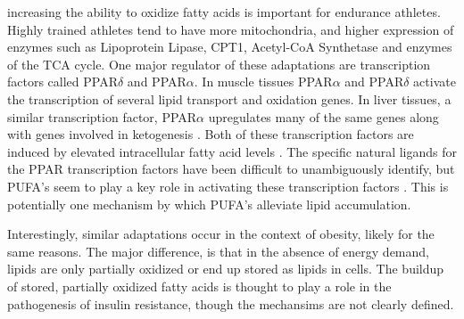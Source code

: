 \documentclass{tufte-handout}
\begin{document}
 increasing the ability to oxidize fatty acids is important for endurance athletes.  Highly trained athletes tend to have more mitochondria, and higher expression of enzymes such as Lipoprotein Lipase, CPT1, Acetyl-CoA Synthetase and enzymes of the TCA cycle.  One major regulator of these adaptations are transcription factors called PPAR$\delta$ and PPAR$\alpha$.  In muscle tissues PPAR$\alpha$ and PPAR$\delta$  activate the transcription of several lipid transport and oxidation genes.  In liver tissues, a similar transcription factor, PPAR$\alpha$ upregulates many of the same genes along with genes involved in ketogenesis \citep{Kersten2000,Badman2007}.  Both of these transcription factors are induced by elevated intracellular fatty acid levels \citep{Keller1993}.  The specific natural ligands for the PPAR transcription factors have been difficult to unambiguously identify, but PUFA's seem to play a key role in activating these transcription factors \citep{Forman1997}.  This is potentially one mechanism by which PUFA's alleviate lipid accumulation.

Interestingly, similar adaptations occur in the context of obesity, likely for the same reasons.  The major difference, is that in the absence of energy demand, lipids are only partially oxidized or end up stored as lipids in cells.  The buildup of stored, partially oxidized fatty acids is thought to play a role in the pathogenesis of insulin resistance, though the mechansims are not clearly defined.






\end{document}
